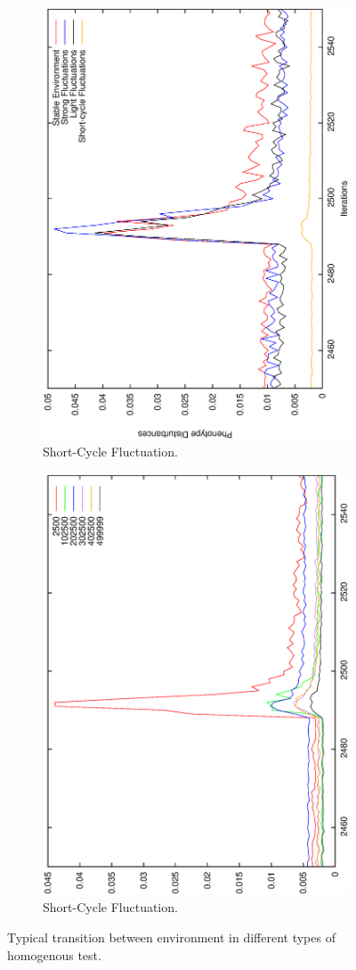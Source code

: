 \begin{figure}[H]
\begin{subfigure}{.25\textwidth}
  \centering
  \includegraphics[width=.7\linewidth, angle =-90]{img/Failavg499999variationSmallb.eps}
  \caption{Short-Cycle Fluctuation.}
  \label{fig:transstest}
\end{subfigure}%
\begin{subfigure}{.25\textwidth}
  \centering
  \includegraphics[width=.7\linewidth, angle =-90]{img/FailavgvarSmallValidvariationSmallb.eps}
  \caption{Short-Cycle Fluctuation.}
  \label{fig:transonly}
\end{subfigure}
\caption{Typical transition between environment in different types of homogenous test.}
\label{fig:trans}
\end{figure}



